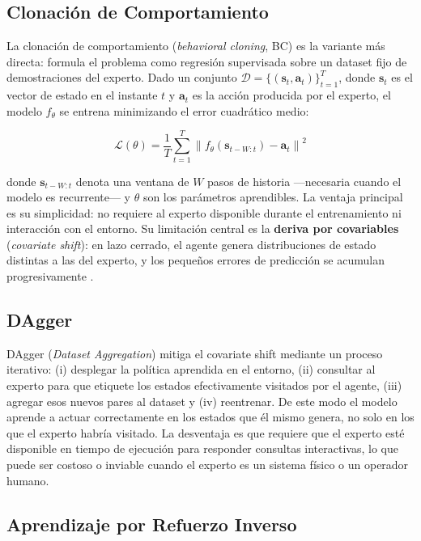 \subsection{Clonación de Comportamiento}

La clonación de comportamiento (\textit{behavioral cloning}, BC) es la variante más directa: formula el problema como regresión supervisada sobre un dataset fijo de demostraciones del experto. Dado un conjunto $\mathcal{D} = \{(\mathbf{s}_t, \mathbf{a}_t)\}_{t=1}^{T}$, donde $\mathbf{s}_t$ es el vector de estado en el instante $t$ y $\mathbf{a}_t$ es la acción producida por el experto, el modelo $f_\theta$ se entrena minimizando el error cuadrático medio:

\begin{equation}
\mathcal{L}(\theta) = \frac{1}{T} \sum_{t=1}^{T} \left\| f_\theta(\mathbf{s}_{t-W:t}) - \mathbf{a}_t \right\|^2
\end{equation}

\noindent donde $\mathbf{s}_{t-W:t}$ denota una ventana de $W$ pasos de historia —necesaria cuando el modelo es recurrente— y $\theta$ son los parámetros aprendibles. La ventaja principal es su simplicidad: no requiere al experto disponible durante el entrenamiento ni interacción con el entorno. Su limitación central es la \textbf{deriva por covariables} (\textit{covariate shift}): en lazo cerrado, el agente genera distribuciones de estado distintas a las del experto, y los pequeños errores de predicción se acumulan progresivamente \cite{kumar2021}.

\subsection{DAgger}

DAgger (\textit{Dataset Aggregation}) \cite{zhang2023} mitiga el covariate shift mediante un proceso iterativo: (i) desplegar la política aprendida en el entorno, (ii) consultar al experto para que etiquete los estados efectivamente visitados por el agente, (iii) agregar esos nuevos pares al dataset y (iv) reentrenar. De este modo el modelo aprende a actuar correctamente en los estados que él mismo genera, no solo en los que el experto habría visitado. La desventaja es que requiere que el experto esté disponible en tiempo de ejecución para responder consultas interactivas, lo que puede ser costoso o inviable cuando el experto es un sistema físico o un operador humano.

\subsection{Aprendizaje por Refuerzo Inverso}

